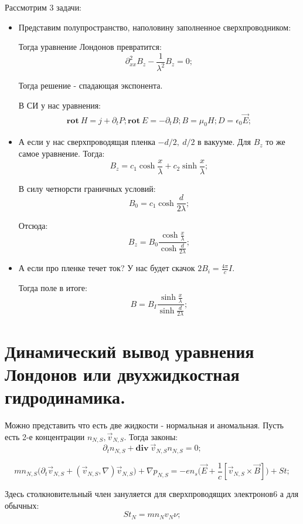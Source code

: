 \documentclass[a4paper, 14pt, russian]{article}
\newcommand{\be}{\begin{equation}}
\newcommand{\ee}{\end{equation}}
\newcommand{\pa}{\partial}
\newcommand{\rot}{\textbf{rot}~}
\renewcommand{\div}{\textbf{div}~}
\begin{document}
	Рассмотрим 3 задачи:
	\begin{itemize}
		\item Представим полупространство, наполовину заполненное сверхпроводником:

			Тогда уравнение Лондонов превратится:
			\be
				\pa^2_{xx} B_z - \frac{1}{\lambda^2} B_z = 0;
			\ee 

			Тогда решение - спадающая экспонента.
			
			В СИ у нас уравнения:
			\begin{eqnarray}
				\rot H = j + \pa_t P;
				\rot E = - \pa_t B;
				B = \mu_0 H;
				D = \epsilon_0 \vec E;
			\end{eqnarray}

		\item  А если у нас сверхпроводящая пленка $-d/2,~d/2$ в вакууме.
				Для $B_z$ то же самое уравнение. Тогда:
				\be
					B_z = c_1 \cosh \frac{x}{\lambda} + c_2 \sinh \frac{x}{\lambda};
				\ee

				В силу четнорсти граничных условий:
				\be
					B_0 =c_1 \cosh \frac{d}{2\lambda};
				\ee 

				Отсюда:
				\be
					B_z = B_0 \frac{\cosh \frac{x}{\lambda}}{\cosh \frac{d}{2\lambda}};
				\ee


			\item А если про пленке течет ток?
				У нас будет скачок $2B_i = \frac{4\pi}{c} I$.

				Тогда поле в итоге:
				\be
					B = B_I \frac{\sinh \frac{x}{\lambda}}{\sinh \frac{d}{2\lambda}};
				\ee

	\end{itemize}


	\section{Динамический вывод уравнения Лондонов или двухжидкостная гидродинамика.}

		Можно представить что есть две жидкости - нормальная и аномальная. 
		Пусть есть 2-е концентрации $n_{N,S}, \vec{v}_{N,S}$. Тогда законы:
		\be
			\pa_t n_{N,S} + \div \vec{v}_{N,S} n_{N,S} = 0;
		\ee

		\be
			mn_{N,S}\big(\pa_t \vec{v}_{N,S} + (\vec{v}_{N,S},\nabla)\vec{v}_{N,S}\big) + \nabla p_{N,S} = 
				- e n_s \big(\vec E + \frac{1}{c} [\vec{v}_{N,S} \times \vec B]\big) + St;
		\ee

		Здесь столкновительный член зануляется для сверхпроводящих электронов6 а для обычных:
		\be
			St_{N} = mn_{N} v_N \nu;
		\ee
\end{document}

